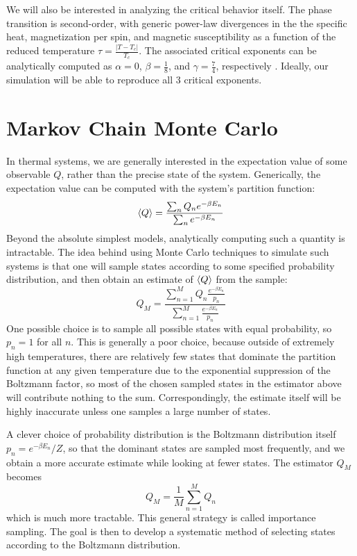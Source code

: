 \documentclass[twocolumn,aps]{revtex4-1} %
\begin{document}
We will also be interested in analyzing the critical behavior itself. The phase transition is second-order, with generic power-law divergences in the the specific heat, magnetization per spin, and magnetic susceptibility as a function of the reduced temperature $\tau = \frac{|T-T_c|}{T_c}$. The associated critical exponents can be analytically computed as $\alpha = 0$, $\beta = \frac{1}{8}$, and $\gamma = \frac{7}{4}$, respectively \cite{cardy}. Ideally, our simulation will be able to reproduce all 3 critical exponents.

\section{Markov Chain Monte Carlo}
In thermal systems, we are generally interested in the expectation value of some observable $Q$, rather than the precise state of the system. Generically, the expectation value can be computed with the system's partition function:
\begin{equation}
	\braket{Q} = \frac{\sum_{n}Q_ne^{-\beta E_n}}{\sum_{n}e^{-\beta E_n}}
\end{equation}
Beyond the absolute simplest models, analytically computing such a quantity is intractable. The idea behind using Monte Carlo techniques to simulate such systems is that one will sample states according to some specified probability distribution, and then obtain an estimate of $\braket{Q}$ from the sample:
\begin{equation}
	Q_M = \frac{\sum^M_{n=1}Q_n\frac{e^{-\beta E_n}}{p_n}}{\sum^M_{n=1}\frac{e^{-\beta E_n}}{p_n}}
\end{equation}
One possible choice is to sample all possible states with equal probability, so $p_n = 1$ for all $n$. This is generally a poor choice, because outside of extremely high temperatures, there are relatively few states that dominate the partition function at any given temperature due to the exponential suppression of the Boltzmann factor, so most of the chosen sampled states in the estimator above will contribute nothing to the sum. Correspondingly, the estimate itself will be highly inaccurate unless one samples a large number of states.

A clever choice of probability distribution is the Boltzmann distribution itself $p_n = e^{-\beta E_n}/Z$, so that the dominant states are sampled most frequently, and we obtain a more accurate estimate while looking at fewer states. The estimator $Q_M$ becomes
\begin{equation}
	Q_M = \frac{1}{M}\sum_{n=1}^MQ_n
\end{equation}
which is much more tractable. This general strategy is called importance sampling. The goal is then to develop a systematic method of selecting states according to the Boltzmann distribution.
\end{document}
